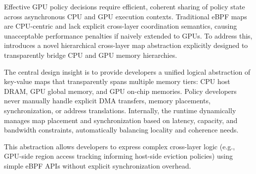 Effective GPU policy decisions require efficient, coherent sharing of policy state across asynchronous CPU and GPU execution contexts. Traditional eBPF maps are CPU-centric and lack explicit cross-layer coordination semantics, causing unacceptable performance penalties if naively extended to GPUs. To address this, \sys introduces a novel hierarchical cross-layer map abstraction explicitly designed to transparently bridge CPU and GPU memory hierarchies.

The central design insight is to provide developers a unified logical abstraction of key-value maps that transparently spans multiple memory tiers: CPU host DRAM, GPU global memory, and GPU on-chip memories. Policy developers never manually handle explicit DMA transfers, memory placements, synchronization, or address translations. Internally, the runtime dynamically manages map placement and synchronization based on latency, capacity, and bandwidth constraints, automatically balancing locality and coherence needs.

This abstraction allows developers to express complex cross-layer logic (e.g., GPU-side region access tracking informing host-side eviction policies) using simple eBPF APIs without explicit synchronization overhead.
